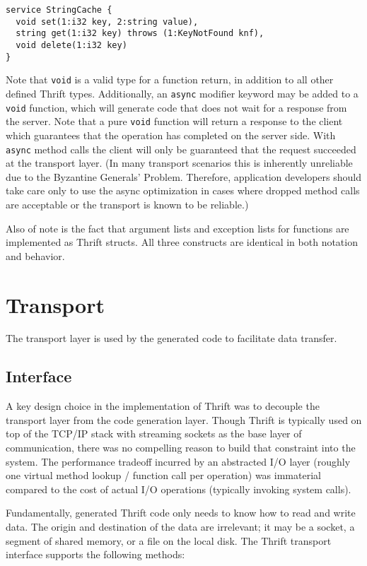 \documentclass[nocopyrightspace,blockstyle]{sigplanconf}
\begin{document}
\begin{verbatim}
service StringCache {
  void set(1:i32 key, 2:string value),
  string get(1:i32 key) throws (1:KeyNotFound knf),
  void delete(1:i32 key) 
}
\end{verbatim}

Note that \texttt{void} is a valid type for a function return, in addition to
all other defined Thrift types. Additionally, an \texttt{async} modifier
keyword may be added to a \texttt{void} function, which will generate code that does
not wait for a response from the server. Note that a pure \texttt{void}
function will return a response to the client which guarantees that the
operation has completed on the server side. With \texttt{async} method calls
the client will only be guaranteed that the request succeeded at the
transport layer. (In many transport scenarios this is inherently unreliable
due to the Byzantine Generals' Problem. Therefore, application developers
should take care only to use the async optimization in cases where dropped
method calls are acceptable or the transport is known to be reliable.)

Also of note is the fact that argument lists and exception lists for functions
are implemented as Thrift structs. All three constructs are identical in both
notation and behavior.

\section{Transport}

The transport layer is used by the generated code to facilitate data transfer.

\subsection{Interface}

A key design choice in the implementation of Thrift was to decouple the
transport layer from the code generation layer. Though Thrift is typically
used on top of the TCP/IP stack with streaming sockets as the base layer of
communication, there was no compelling reason to build that constraint into 
the system. The performance tradeoff incurred by an abstracted I/O layer
(roughly one virtual method lookup / function call per operation) was
immaterial compared to the cost of actual I/O operations (typically invoking
system calls).

Fundamentally, generated Thrift code only needs to know how to read and
write data. The origin and destination of the data are irrelevant; it may be a
socket, a segment of shared memory, or a file on the local disk. The Thrift
transport interface supports the following methods:
\end{document}
